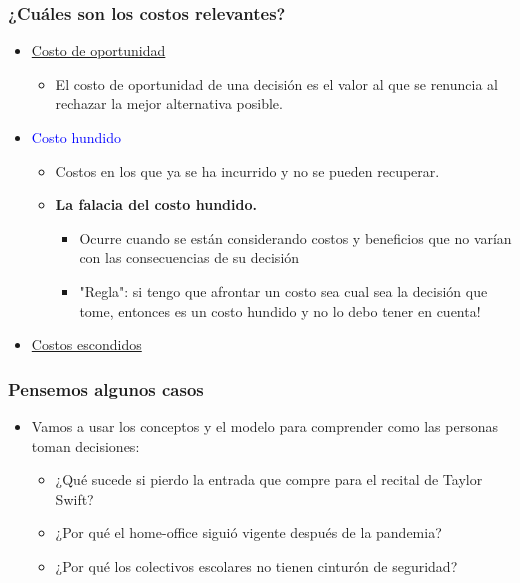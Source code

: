 \documentclass{beamer}
\begin{document}
\begin{frame}
\frametitle{¿Cuáles son los costos relevantes? }
\begin{itemize}
    \item  \href{https://econ.video/2017/08/28/the-simpsons-opportunity-cost-of-lines/}{Costo de oportunidad}
    \begin{itemize}
    \vspace{2mm}
        \item  El costo de oportunidad de una decisión es el valor al que se renuncia al rechazar la mejor alternativa posible.
    \end{itemize}
    \vspace{2mm}
    \item \textcolor{blue}{Costo hundido}
    \begin{itemize}
    \vspace{2mm}
    \item Costos en los que ya se ha incurrido y no se pueden recuperar.
    \end{itemize}
    \vspace{2mm}
    \begin{itemize}
    \item \textbf{La falacia del costo hundido.}  
        \begin{itemize}
        \item Ocurre cuando se están considerando costos y beneficios que no varían con las consecuencias de su decisión
        \item  "Regla": si tengo que afrontar un costo sea cual sea la decisión que tome, entonces es un costo hundido y no lo debo tener en cuenta!
        \end{itemize}
    \end{itemize}
    \vspace{2mm}
    \item \href{https://www.goodfood.com.au/eat-out/good-food-guides/the-surprising-costs-of-running-a-restaurant-20180327-h0y23c}{Costos escondidos} 
    \vspace{2mm}
\end{itemize} 
\end{frame}

\begin{frame}
\frametitle{Pensemos algunos casos}
\begin{itemize}
    \item Vamos a usar los conceptos y el modelo para comprender como las personas toman decisiones: \vspace{2mm}
    \begin{itemize} 
    \item ¿Qué sucede si pierdo la entrada que compre para el recital de Taylor Swift? \vspace{2mm}
    \item ¿Por qué el home-office siguió vigente después de la pandemia? \vspace{2mm}
    \item ¿Por qué los colectivos escolares no tienen cinturón de seguridad? 
    \end{itemize}
\end{itemize} 
\end{frame}
\end{document}
